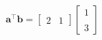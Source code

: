 \documentclass[preview]{standalone}
\begin{document}
\begin{align*}
\mathbf{a}^\top \mathbf{b} = \begin{bmatrix} 2 & 1 \end{bmatrix}\begin{bmatrix} 1 \\ \\ 3 \end{bmatrix}
\end{align*}
\end{document}
